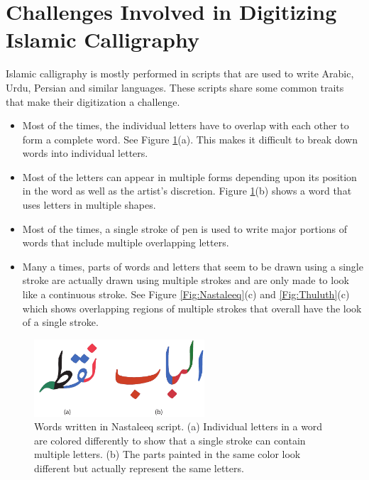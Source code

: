 \section{Challenges Involved in Digitizing Islamic Calligraphy}
{
    Islamic calligraphy is mostly performed in scripts that are used to write Arabic, Urdu, Persian and similar languages. These scripts share some common traits that make their digitization a challenge.

    \begin{itemize}
    \item Most of the times, the individual letters have to overlap with each other to form a complete word. See Figure \ref{Fig:UrduScriptBreakDown}(a). This makes it difficult to break down words into individual letters.
    \item Most of the letters can appear in multiple forms depending upon its position in the word as well as the artist's discretion. Figure \ref{Fig:UrduScriptBreakDown}(b) shows a word that uses letters in multiple shapes. 
    \item Most of the times, a single stroke of pen is used to write major portions of words that include multiple overlapping letters. 
    \item Many a times, parts of words and letters that seem to be drawn using a single stroke are actually drawn using multiple strokes and are only made to look like a continuous stroke. See Figure \ref{Fig:Nastaleeq}(c) and \ref{Fig:Thuluth}(c) which shows overlapping regions of multiple strokes that overall have the look of a single stroke.
    \end{itemize}

    \begin{figure}[!t]
        \centering
        \includegraphics[width=2.5in]{../Images/Nuqtah.pdf}
        \caption{Words written in Nastaleeq script. (a) Individual letters in a word are colored differently to show that a single stroke can contain multiple letters. (b) The parts painted in the same color look different but actually represent the same letters.}
        \label{Fig:UrduScriptBreakDown}
    \end{figure}

}
